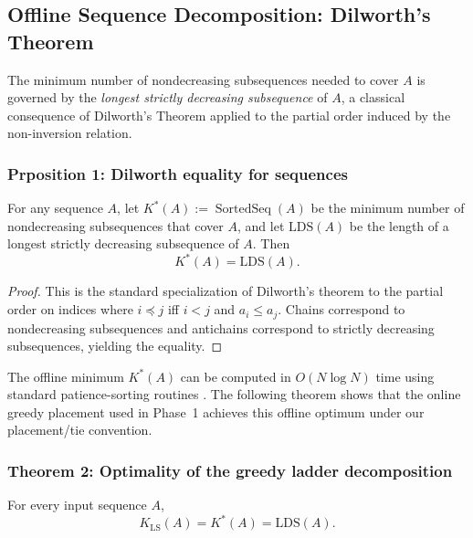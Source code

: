 \documentclass[12pt,a4paper]{article}
\theoremstyle{plain}
\theoremstyle{definition}
\DeclareMathOperator{\SortedSeq}{SortedSeq}
\begin{document}
\subsection{Offline Sequence Decomposition: Dilworth's Theorem}
\label{sec:dilworth}

The minimum number of nondecreasing subsequences needed to cover $A$ is
governed by the \emph{longest strictly decreasing subsequence} of $A$, a
classical consequence of Dilworth's Theorem \cite{Dilworth1950} applied to
the partial order induced by the non-inversion relation.

\subsubsection {Prposition 1: Dilworth equality for sequences}

For any sequence $A$, let $K^*(A) := \SortedSeq(A)$ be the minimum number
of nondecreasing subsequences that cover $A$, and let $\mathrm{LDS}(A)$ be
the length of a longest strictly decreasing subsequence of $A$.  Then
\[ K^*(A) = \mathrm{LDS}(A). \]


\begin{proof}
This is the standard specialization of Dilworth's theorem to the partial
order on indices where $i \preceq j$ iff $i<j$ and $a_i \le a_j$.  Chains
correspond to nondecreasing subsequences and antichains correspond to
strictly decreasing subsequences, yielding the equality.
\end{proof}

The offline minimum $K^*(A)$ can be computed in $O(N\log N)$ time using
standard patience-sorting routines \cite{Fredman1975,AldousDiaconis1999}.
The following theorem shows that the online greedy placement used in
Phase~1 achieves this offline optimum under our placement/tie convention.

\subsubsection {Theorem 2: Optimality of the greedy ladder decomposition}

For every input sequence $A$,
\[ K_{\mathrm{LS}}(A) = K^*(A) = \mathrm{LDS}(A). \]
\end{document}

